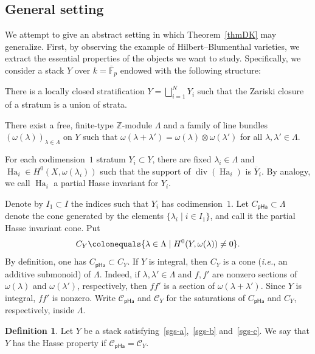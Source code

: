 \documentclass[11pt]{amsart}
\numberwithin{equation}{section}
\theoremstyle{definition}
\newtheorem{definition}[theorem]{Definition}
\theoremstyle{remark}
\newcommand{\pha}{\mathsf{pHa}}
\newcommand{\Ccal}{{\mathcal C}}
\newcommand{\FF}{\mathbb{F}}
\newcommand{\ZZ}{\mathbb{Z}}
\renewcommand{\div}{\operatorname{div}}
\DeclareMathOperator{\Ha}{Ha}
\begin{document}
\subsection{General setting}\label{sec-gen-set}
We attempt to give an abstract setting in which Theorem~\ref{thmDK} may generalize. First, by observing the example of Hilbert--Blumenthal varieties, we extract the essential properties of the objects we want to study. Specifically, we consider a stack $Y$ over $k=\overline{\FF}_p$ endowed with the following structure:
\begin{alist}
\item\label{sgs-a} There is a locally closed stratification $Y=\bigsqcup_{i=1}^N Y_i$ such that the Zariski closure of a stratum is a union of strata.
\item\label{sgs-b} There exist a free, finite-type $\ZZ$-module $\Lambda$ and a family of line bundles $(\omega(\lambda))_{\lambda\in \Lambda}$ on $Y$ such that $\omega(\lambda+\lambda')=\omega(\lambda)\otimes \omega(\lambda')$ for all $\lambda,\lambda'\in \Lambda$.
\item\label{sgs-c} For each codimension~$1$ stratum $Y_i\subset Y$, there are fixed $\lambda_i\in \Lambda$ and $\Ha_i\in H^0(X,\omega(\lambda_i))$ such that the support of $\div(\Ha_i)$ is $\overline{Y}_i$. By analogy, we call $\Ha_i$ a partial Hasse invariant for $Y_i$.
\end{alist}
Denote by $I_1\subset I$ the indices such that $Y_i$ has codimension~$1$. Let $C_{\pha}\subset \Lambda$ denote the cone generated by the elements $\{\lambda_i \mid i\in I_1\}$, and call it the partial Hasse invariant cone. Put
\begin{equation}\label{CY-cone}
    C_Y\colonequals \{\lambda\in \Lambda \mid H^0(Y,\omega(\lambda))\neq 0\}.
\end{equation}
By definition, one has $C_{\pha}\subset C_Y$. If $Y$ is integral, then $C_Y$ is a cone (\textit{i.e.}, an additive submonoid) of $\Lambda$. Indeed, if $\lambda,\lambda'\in \Lambda$ and $f,f'$ are nonzero sections of $\omega(\lambda)$ and $\omega(\lambda')$, respectively, then $ff'$ is a section of $\omega(\lambda+\lambda')$. Since $Y$ is integral, $ff'$ is nonzero. Write $\Ccal_{\pha}$ and $\Ccal_Y$ for the saturations of $C_{\pha}$ and $C_Y$, respectively, inside $\Lambda$.

\begin{definition}\label{def-Hasse-property}
Let $Y$ be a stack satisfying~\eqref{sgs-a},~\eqref{sgs-b} and~\eqref{sgs-c}. We say that $Y$ has the Hasse property if $\Ccal_{\pha} = \Ccal_Y $.
\end{definition}
\end{document}

